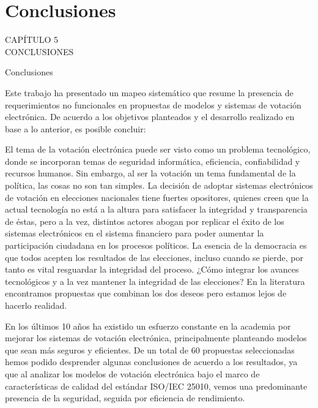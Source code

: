 
{
\Hide
\chapter{Conclusiones}
}

\begin{titular} 
	\uppercase{
	capítulo 5 \\
	Conclusiones \\
	}
\end{titular}

{
	\fontsize{22pt}{26.4pt}%
	\selectfont%
	Conclusiones
}

Este trabajo ha presentado un mapeo sistemático que resume la presencia
de requerimientos no funcionales en propuestas de modelos y sistemas
de votación electrónica. De acuerdo a los objetivos planteados y el 
desarrollo realizado en base a lo anterior, es posible concluir: 

El tema de la votación electrónica puede ser visto como un problema tecnológico, donde
se incorporan temas de seguridad informática, eficiencia, confiabilidad y recursos humanos. Sin embargo,
al ser la votación un tema fundamental de la política, las cosas no son tan simples. La decisión
de adoptar sistemas electrónicos de votación en elecciones nacionales tiene fuertes opositores, quienes
creen que la actual tecnología no está a la altura para satisfacer la integridad y transparencia de éstas, pero a
la vez, distintos actores abogan por replicar el éxito de los sistemas electrónicos en el sistema financiero
para poder aumentar la participación ciudadana en los procesos políticos. La esencia de la
democracia es que todos acepten los resultados de las elecciones, incluso cuando se pierde, por tanto
es vital resguardar la integridad del proceso. ¿Cómo integrar los avances 
tecnológicos y a la vez mantener la integridad de las elecciones? En la literatura encontramos
propuestas que combinan los dos deseos pero estamos lejos de hacerlo realidad.
	
En los últimos 10 años ha existido un esfuerzo constante en la academia por mejorar 
los sistemas de votación electrónica, principalmente planteando modelos que sean más seguros
y eficientes. De un total de 60 propuestas seleccionadas hemos podido desprender algunas 
conclusiones de acuerdo a los resultados, ya que al analizar los modelos de votación electrónica 
bajo el marco de características de calidad del estándar ISO/IEC 25010, vemos una
predominante presencia de la seguridad, seguida por eficiencia de rendimiento. 
	
